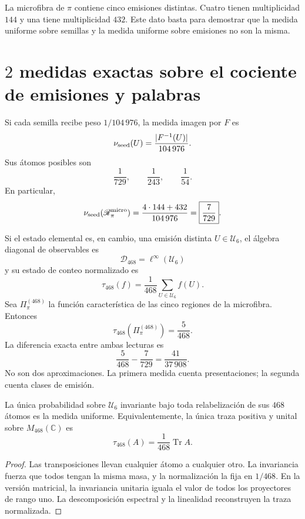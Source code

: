 La microfibra de \(\pi\) contiene cinco emisiones distintas. Cuatro tienen
multiplicidad \(144\) y una tiene multiplicidad \(432\). Este dato basta
para demostrar que la medida uniforme sobre semillas y la medida uniforme
sobre emisiones no son la misma.

\section{\(2\) medidas exactas sobre el cociente de emisiones y palabras}

Si cada semilla recibe peso \(1/104\,976\), la medida imagen por \(F\) es
\[
 \nu_{\rm seed}(U)
 =\frac{|F^{-1}(U)|}{104\,976}.
\]
Sus átomos posibles son
\[
 \frac1{729},\qquad\frac1{243},\qquad\frac1{54}.
\]
En particular,
\[
 \nu_{\rm seed}(\mathscr R_\pi^{\rm micro})
 =\frac{4\cdot144+432}{104\,976}
 =\boxed{\frac7{729}}.
\]

Si el estado elemental es, en cambio, una emisión distinta
\(U\in\mathcal U_6\), el álgebra diagonal de observables es
\[
 \mathcal D_{468}=\ell^\infty(\mathcal U_6)
\]
y su estado de conteo normalizado es
\[
 \tau_{468}(f)
 =\frac1{468}\sum_{U\in\mathcal U_6}f(U).
\]
Sea \(\Pi_\pi^{(468)}\) la función característica de las cinco regiones de la
microfibra. Entonces
\[
 \boxed{\tau_{468}(\Pi_\pi^{(468)})=\frac5{468}.}
\]
La diferencia exacta entre ambas lecturas es
\[
 \frac5{468}-\frac7{729}
 =\frac{41}{37\,908}.
\]
No son dos aproximaciones. La primera medida cuenta presentaciones; la
segunda cuenta clases de emisión.

\begin{theorem}
\label{p3-20260826:thm:unicidad-medida-468}
La única probabilidad sobre \(\mathcal U_6\) invariante bajo toda
relabelización de sus \(468\) átomos es la medida uniforme.
Equivalentemente, la única traza positiva y unital sobre
\(M_{468}(\mathbb C)\) es
\[
 \tau_{468}(A)=\frac1{468}\operatorname{Tr}A.
\]
\end{theorem}

\begin{proof}
Las transposiciones llevan cualquier átomo a cualquier otro. La invariancia
fuerza que todos tengan la misma masa, y la normalización la fija en
\(1/468\). En la versión matricial, la invariancia unitaria iguala el valor
de todos los proyectores de rango uno. La descomposición espectral y la
linealidad reconstruyen la traza normalizada.
\end{proof}

